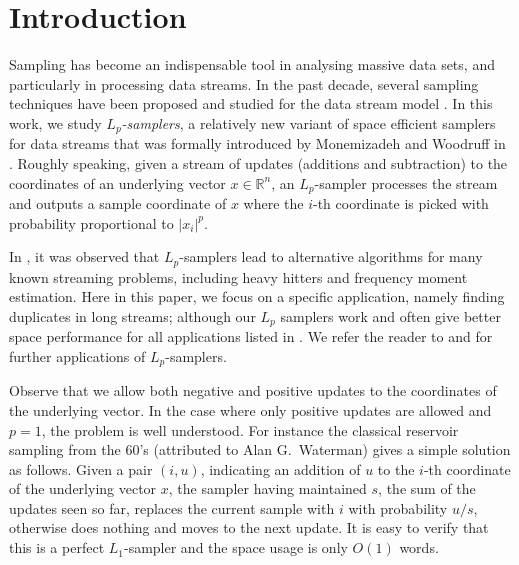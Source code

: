 
\section{Introduction}
\label{sec:intro}
Sampling has become an indispensable tool in analysing massive data sets,
and particularly in processing data streams. In the past decade, 
several sampling techniques have been proposed and studied for the data stream
model \cite{BabcockDM02,DuffieldLT07,BravermanOZ09,CormodeMYZ10,MonemizadehW10,AndoniKO10}.
In this work, we study {\em $L_p$-samplers}, a relatively new variant of
space efficient samplers for data streams that
was formally introduced by Monemizadeh and
Woodruff in \cite{MonemizadehW10}. 
 Roughly speaking, given a stream of updates (additions and subtraction) 
to the coordinates of an underlying vector $x \in \mathbb R^n$,
an $L_p$-sampler processes the stream and 
outputs a sample coordinate of $x$ where the
$i$-th coordinate is picked with probability proportional to
$|x_i|^p$.

In \cite{MonemizadehW10}, it was observed that $L_p$-samplers lead to 
alternative algorithms for many known streaming problems, including  
heavy hitters and frequency moment estimation. Here in this paper, we
focus on a specific application, namely finding duplicates in long streams;
although our $L_p$ samplers  work and often give better space performance
for all applications listed in \cite{MonemizadehW10}.
We refer the reader to \cite{MonemizadehW10} and \cite{AndoniKO10} 
for further applications of $L_p$-samplers.


Observe that we allow both negative and positive updates to the coordinates of the underlying vector.
In the case where only positive updates are allowed and $p=1$, the problem is well understood.
    For instance the classical reservoir sampling \cite{Knuth69} from the 60's
    (attributed to Alan G.~Waterman) gives a simple 
    solution as follows. Given a pair $(i,u)$, 
    indicating an addition of $u$ to the  $i$-th coordinate of 
    the underlying vector $x$, the sampler having maintained $s$, the sum of the 
    updates seen so far, replaces
     the current sample with $i$ with probability $u/s$, otherwise does nothing 
     and moves to the next update. It is easy to verify that this is a perfect
     $L_1$-sampler and the space usage is only $O(1)$ words.
    
